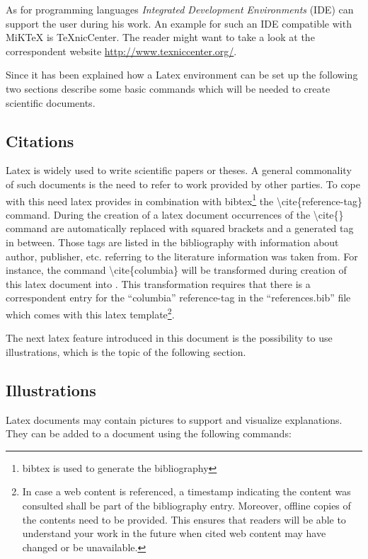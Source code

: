 As for programming languages \textit{Integrated Development Environments} (IDE) can support the user during his work.
An example for such an IDE compatible with MiKTeX is TeXnicCenter.
The reader might want to take a look at the correspondent website \url{http://www.texniccenter.org/}.


Since it has been explained how a Latex environment can be set up the following two sections describe some basic commands which will be needed to create scientific documents.

\subsection{Citations}
\label{sect:citations}

Latex is widely used to write scientific papers or theses.
A general commonality of such documents is the need to refer to work provided by other parties.
To cope with this need latex provides in combination with bibtex\footnote{bibtex is used to generate the bibliography} the \textbackslash cite\{reference-tag\} command.
During the creation of a latex document occurrences of the \textbackslash cite\{\} command are automatically replaced with squared brackets and a generated tag in between.
Those tags are listed in the bibliography with information about author, publisher, etc. referring to the literature information was taken from.
For instance, the command \textbackslash cite\{columbia\} will be transformed during creation of this latex document into \cite{columbia}.
This transformation requires that there is a correspondent entry for the \enquote{columbia} reference-tag in the \enquote{references.bib} file which comes with this latex template\footnote{In case a web content is referenced, a timestamp indicating the content was consulted shall be part of the bibliography entry. 
Moreover, offline copies of the contents need to be provided. This ensures that readers will be able to understand your work in the future when cited web content may have changed or be unavailable.}.

The next latex feature introduced in this document is the possibility to use illustrations, which is the topic of the following section.

\subsection{Illustrations}
\label{sect:illustrations}

Latex documents may contain pictures to support and visualize explanations.
They can be added to a document using the following commands:

